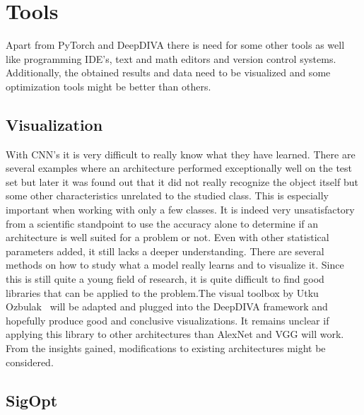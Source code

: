 \section{Tools}

Apart from PyTorch and DeepDIVA there is need for some other tools as well like programming IDE's, text and math editors and version control systems. Additionally, the obtained results and data need to be visualized and some optimization tools might be better than others.\\


\subsection{Visualization}

With CNN's it is very difficult to really know what they have learned. There are several examples where an architecture performed exceptionally well on the test set but later it was found out that it did not really recognize the object itself but some other characteristics unrelated to the studied class. This is especially important when working with only a few classes. It is indeed very unsatisfactory from a scientific standpoint to use the accuracy alone to determine if an architecture is well suited for a problem or not. Even with other statistical parameters added, it still lacks a deeper understanding. There are several methods on how to study what a model really learns and to visualize it. Since this is still quite a young field of research, it is quite difficult to find good libraries that can be applied to the problem.The visual toolbox by Utku Ozbulak~\cite{viztoolbox} will be adapted and plugged into the DeepDIVA framework and hopefully produce good and conclusive visualizations. It remains unclear if applying this library to other architectures than AlexNet and VGG will work. From the insights gained, modifications to existing architectures might be considered. \\


\subsection{SigOpt}

